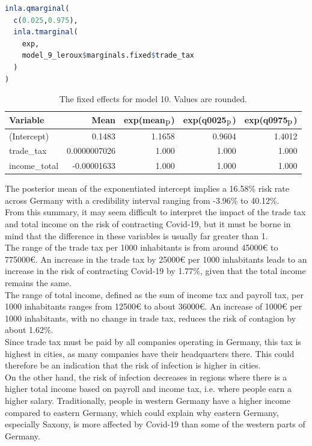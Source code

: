 \begin{lstlisting}[caption={Extracting the credibility interval for a coefficient}, label={codeCredibility}, language=R]
inla.qmarginal(
  c(0.025,0.975),
  inla.tmarginal(
    exp,
    model_9_leroux$marginals.fixed$trade_tax
  )
)
\end{lstlisting}
\begin{table}[H] 
\caption{The fixed effects for model 10. Values are rounded. \label{fixedDemoGermany}}
\begin{tabular}{l r r r r}
\toprule
\textbf{Variable}	& \textbf{Mean}	& \textbf{exp(mean$_{\hbox{p}}$)} & \textbf{exp(q0025$_{\hbox{p}}$)} & \textbf{exp(q0975$_{\hbox{p}}$)} \\
\midrule
(Intercept) & 0.1483 & 1.1658 & 0.9604 & 1.4012\\
trade\_tax & 0.0000007026 & 1.000 & 1.000  & 1.000 \\
income\_total & -0.00001633 & 1.000 & 1.000 & 1.000\\
\bottomrule
\end{tabular}
\end{table}
The posterior mean of the exponentiated intercept implies a 16.58\% risk rate across Germany with a credibility interval ranging from -3.96\% to 40.12\%.  \\
From this summary, it may seem difficult to interpret the impact of the trade tax and total income on the risk of contracting Covid-19, but it must be borne in mind that the difference in these variables is usually far greater than 1. \\
The range of the trade tax per 1000 inhabitants is from around 45000€ to 775000€. An increase in the trade tax by 25000€ per 1000 inhabitants leads to an increase in the risk of contracting Covid-19 by 1.77\%, given that the total income remains the same. \\
The range of total income, defined as the sum of income tax and payroll tax, per 1000 inhabitants ranges from 12500€ to about 36000€. An increase of 1000€ per 1000 inhabitants, with no change in trade tax, reduces the risk of contagion by about 1.62\%. \\
Since trade tax must be paid by all companies operating in Germany, this tax is highest in cities, as many companies have their headquarters there. This could therefore be an indication that the risk of infection is higher in cities. \\
On the other hand, the risk of infection decreases in regions where there is a higher total income based on payroll and income tax, i.e. where people earn a higher salary. Traditionally, people in western Germany have a higher income compared to eastern Germany, which could explain why eastern Germany, especially Saxony, is more affected by Covid-19 than some of the western parts of Germany.
